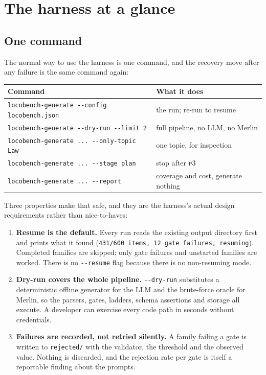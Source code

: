\documentclass[11pt]{article}
\begin{document}
\section{The harness at a glance}
\label{sec:harness}

\subsection{One command}

The normal way to use the harness is one command, and the recovery move after any failure is the
same command again:

\begin{center}\small
\begin{tabular}{@{}ll@{}}
\toprule
\textbf{Command} & \textbf{What it does}\\
\midrule
\texttt{locobench-generate -{}-config locobench.json} & the run; re-run to resume\\
\texttt{locobench-generate -{}-dry-run -{}-limit 2}   & full pipeline, no LLM, no Merlin\\
\texttt{locobench-generate ... -{}-only-topic Law}    & one topic, for inspection\\
\texttt{locobench-generate ... -{}-stage plan}        & stop after \textsc{p3}\\
\texttt{locobench-generate ... -{}-report}            & coverage and cost, generate nothing\\
\bottomrule
\end{tabular}
\end{center}

Three properties make that safe, and they are the harness's actual design requirements rather
than nice-to-haves:

\begin{enumerate}[leftmargin=*,nosep,label=(\arabic*)]
  \item \textbf{Resume is the default.} Every run reads the existing output directory first and
        prints what it found (\texttt{431/600 items, 12 gate failures, resuming}). Completed
        families are skipped; only gate failures and unstarted families are worked. There is no
        \texttt{-{}-resume} flag because there is no non-resuming mode.
  \item \textbf{Dry-run covers the whole pipeline.} \texttt{-{}-dry-run} substitutes a
        deterministic offline generator for the LLM and the brute-force oracle for Merlin, so the
        parsers, gates, ladders, schema assertions and storage all execute. A developer can
        exercise every code path in seconds without credentials.
  \item \textbf{Failures are recorded, not retried silently.} A family failing a gate is written
        to \texttt{rejected/} with the validator, the threshold and the observed value. Nothing is
        discarded, and the rejection rate per gate is itself a reportable finding about the
        prompts.
\end{enumerate}
\end{document}
